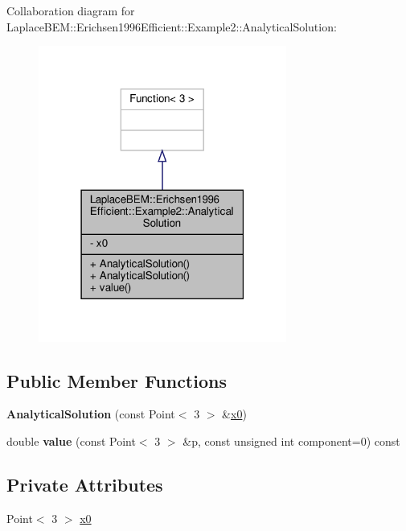 Collaboration diagram for Laplace\+B\+EM\+:\+:Erichsen1996\+Efficient\+:\+:Example2\+:\+:Analytical\+Solution\+:\nopagebreak
\begin{figure}[H]
\begin{center}
\leavevmode
\includegraphics[width=231pt]{classLaplaceBEM_1_1Erichsen1996Efficient_1_1Example2_1_1AnalyticalSolution__coll__graph}
\end{center}
\end{figure}
\subsection*{Public Member Functions}
\begin{DoxyCompactItemize}
\item 
\mbox{\label{classLaplaceBEM_1_1Erichsen1996Efficient_1_1Example2_1_1AnalyticalSolution_af37ad65fa1e788d7f2eda134752cb45d}} 
{\bfseries Analytical\+Solution} (const Point$<$ 3 $>$ \&\hyperlink{classLaplaceBEM_1_1Erichsen1996Efficient_1_1Example2_1_1AnalyticalSolution_abc18babc7510cbb8228ae4382392bac8}{x0})
\item 
\mbox{\label{classLaplaceBEM_1_1Erichsen1996Efficient_1_1Example2_1_1AnalyticalSolution_a8f1435b24dd481605b1655dc89459c3f}} 
double {\bfseries value} (const Point$<$ 3 $>$ \&p, const unsigned int component=0) const
\end{DoxyCompactItemize}
\subsection*{Private Attributes}
\begin{DoxyCompactItemize}
\item 
Point$<$ 3 $>$ \hyperlink{classLaplaceBEM_1_1Erichsen1996Efficient_1_1Example2_1_1AnalyticalSolution_abc18babc7510cbb8228ae4382392bac8}{x0}
\end{DoxyCompactItemize}


